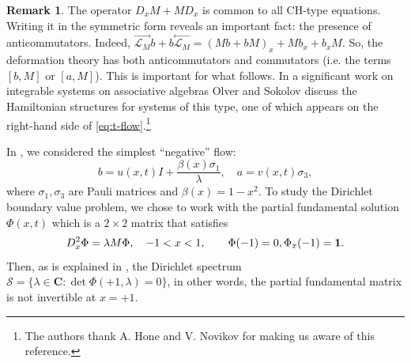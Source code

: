 \documentclass[10pt,a4paper]{article}
\numberwithin{equation}{section}
\theoremstyle{plain}
\theoremstyle{definition}
\newtheorem{remark}[remark]{Remark}
\newcommand{\C}{\mathbf{C}}
\newcommand{\InMb}{\stackrel{\leftarrow}{\mathcal{L}_{M}}}
\newcommand{\InMf}{\stackrel{\rightarrow}{\mathcal{L}_{M}}}
\newcommand{\bo}{{\bf 1}}
\renewcommand{\l}{\lambda}
\begin{document}
\begin{remark} The operator $D_xM+MD_x$ is common to all CH-type equations.  Writing it in the symmetric form 
reveals an important fact: the presence of anticommutators.  Indeed, $\InMf b+b\InMb=(Mb+bM)_x+Mb_x+b_xM$.  So, the deformation theory has both 
anticommutators and commutators (i.e.  the terms $[b,M]$ or $[a,M]$).  This is important for what follows.  In a significant  work on integrable systems on associative algebras 
Olver and Sokolov \cite{Olver-Sokolov:IS-associative} discuss the Hamiltonian structures for systems of this type, one of which appears on the right-hand side of \autoref{eq:t-flow}.\footnote{The authors thank A. Hone and V. Novikov for making us aware of this reference.}
\end{remark}
In \cite{beals-szmigielski:2021p:2CH-euler-bernoulli-beam-noncommutative-continued-fractions}, we considered the simplest ``negative'' flow: $$b=u(x,t)I +\frac{\beta(x)\sigma_1}{\lambda}, \quad a=v(x,t)\sigma_3, $$ where $\sigma_1, \sigma_3$ are Pauli matrices and 
$\beta(x)=1-x^2$.  To study the Dirichlet boundary value problem, we chose to work with the partial fundamental solution 
$\Phi(x,t)$ which is a $2\times 2$ matrix that satisfies 
\begin{equation} 
D_x^2 \Phi=\lambda M \Phi, \quad -1<x<1, \quad \quad \Phi(-1)=0, \Phi_x(-1)=\bo. 
\end{equation} 
Then, as is explained in \cite{beals-szmigielski:2021p:2CH-euler-bernoulli-beam-noncommutative-continued-fractions},  the Dirichlet spectrum $\mathcal{S}=\{\l \in \C: \det \Phi(+1,\lambda)=0\}$, in other words, 
the partial fundamental matrix is not invertible at $x=+1$.  
\end{document}
